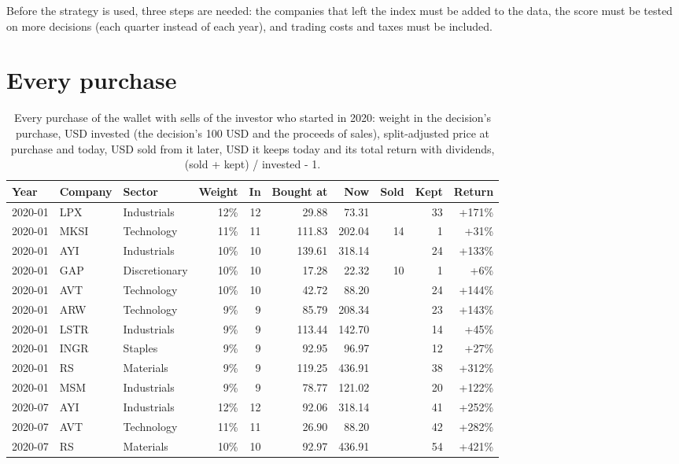 \documentclass[11pt,a4paper]{article}
\begin{document}
Before the strategy is used, three steps are needed: the companies that left the index must be added to the data, the score must be tested on more decisions (each quarter instead of each year), and trading costs and taxes must be included.

\newpage
\appendix
\section{Every purchase}
\label{app:purchases}
{\small
\begin{longtable}{l l l r r r r r r r}
\caption{Every purchase of the wallet with sells of the investor who started in 2020: weight in the decision's purchase, USD invested (the decision's 100 USD and the proceeds of sales), split-adjusted price at purchase and today, USD sold from it later, USD it keeps today and its total return with dividends, (sold + kept) / invested - 1.}\label{tab:purchases}\\
\hline
Year & Company & Sector & Weight & In & Bought at & Now & Sold & Kept & Return \\
\hline
\endhead
2020-01 & LPX & Industrials & 12\% & 12 & 29.88 & 73.31 &  & 33 & +171\% \\
2020-01 & MKSI & Technology & 11\% & 11 & 111.83 & 202.04 & 14 & 1 & +31\% \\
2020-01 & AYI & Industrials & 10\% & 10 & 139.61 & 318.14 &  & 24 & +133\% \\
2020-01 & GAP & Discretionary & 10\% & 10 & 17.28 & 22.32 & 10 & 1 & +6\% \\
2020-01 & AVT & Technology & 10\% & 10 & 42.72 & 88.20 &  & 24 & +144\% \\
2020-01 & ARW & Technology & 9\% & 9 & 85.79 & 208.34 &  & 23 & +143\% \\
2020-01 & LSTR & Industrials & 9\% & 9 & 113.44 & 142.70 &  & 14 & +45\% \\
2020-01 & INGR & Staples & 9\% & 9 & 92.95 & 96.97 &  & 12 & +27\% \\
2020-01 & RS & Materials & 9\% & 9 & 119.25 & 436.91 &  & 38 & +312\% \\
2020-01 & MSM & Industrials & 9\% & 9 & 78.77 & 121.02 &  & 20 & +122\% \\
2020-07 & AYI & Industrials & 12\% & 12 & 92.06 & 318.14 &  & 41 & +252\% \\
2020-07 & AVT & Technology & 11\% & 11 & 26.90 & 88.20 &  & 42 & +282\% \\
2020-07 & RS & Materials & 10\% & 10 & 92.97 & 436.91 &  & 54 & +421\% \\

\end{longtable}}
\end{document}
